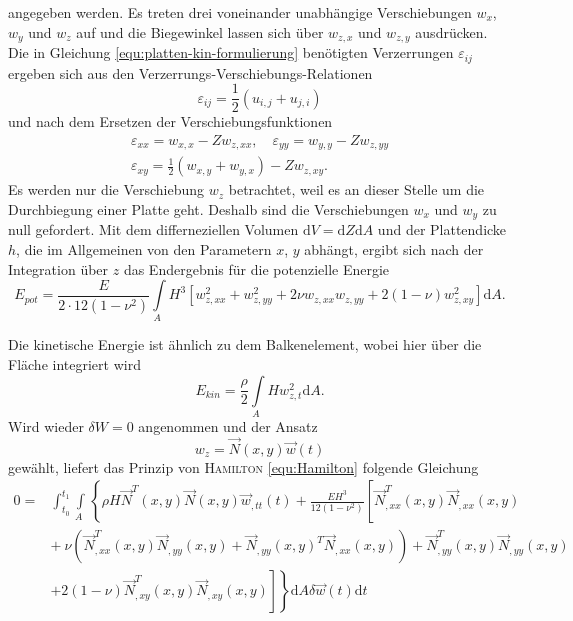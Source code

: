 \documentclass[a4paper,10pt,twoside]{article}
\numberwithin{equation}{section} %
\numberwithin{figure}{section}   %
\numberwithin{table}{section}    %
\begin{document}
	angegeben werden. Es treten drei voneinander unabhängige Verschiebungen $ w_{x} $, $ w_{y} $ und $ w_{z} $ auf und die Biegewinkel lassen sich über $ w_{z,x} $ und $ w_{z,y} $ ausdrücken. Die in Gleichung \eqref{equ:platten-kin-formulierung} benötigten Verzerrungen $ \varepsilon_{ij} $ ergeben sich aus den Verzerrungs-Verschiebungs-Relationen
	\begin{equation}\label{equ:verschiebung-verzerrung-relation}
	\varepsilon_{ij} = \frac{1}{2} \left( u_{i,j} + u_{j,i} \right) 
	\end{equation}
	und nach dem Ersetzen der Verschiebungsfunktionen
	\begin{equation}\label{equ:verschiebung-verzerrung-form}
	\begin{array}{l}
	\varepsilon_{xx}=w_{x,x}-Z w_{z,xx}, \quad \varepsilon_{yy}=w_{y,y}-Z w_{z,yy}\\
	\varepsilon_{xy}=\frac{1}{2}\left( w_{x,y}+w_{y,x} \right) -Z w_{z,xy}.
	\end{array}
	\end{equation}
	Es werden nur die Verschiebung $w_{z}$ betrachtet, weil es an dieser Stelle um die Durchbiegung einer Platte geht. Deshalb sind die Verschiebungen $ w_{x} $ und $ w_{y} $ zu null gefordert. Mit dem differneziellen Volumen $ \mathrm{d}V=\mathrm{d}Z\mathrm{d}A $ und der Plattendicke $h$, die im Allgemeinen von den Parametern $x$, $y$ abhängt, ergibt sich nach der Integration über $z$ das Endergebnis für die potenzielle Energie
	\begin{equation}\label{equ:platten-pot-energie-end}
	E_{pot}=\frac{E}{2\cdot12(1-\nu^{2})} \underset{A \ \ }{\int} H^{3} \left[ w_{z,xx}^{2}+w_{z,yy}^{2}+2\nu w_{z,xx}w_{z,yy}+2(1-\nu)w_{z,xy}^{2} \right] \mathrm{d}A.
	\end{equation}
	
	Die kinetische Energie ist ähnlich zu dem Balkenelement, wobei hier über die Fläche integriert wird
	\begin{equation}\label{equ:platten-kin-energie}
	E_{kin}= \frac{\rho}{2} \underset{A \ \ }{\int} Hw_{z,t}^{2} \mathrm{d}A.
	\end{equation}
	Wird wieder $\delta W = 0$ angenommen und der Ansatz
	\begin{equation}\label{equ:platten-w-ansatz}
	w_{z} = \vec{N}(x,y)\vec{w}(t)
	\end{equation}
	gewählt, liefert das Prinzip von \textsc{Hamilton} \eqref{equ:Hamilton} folgende Gleichung 
	\begin{equation}\label{equ:platten-hamilton-ansatz}
	\begin{split}	
	0= & \int_{t_{0}}^{t_{1}} \underset{A \ \ }{\int} \left\lbrace  \rho H \vec{N}^{T}(x,y) \vec{N}(x,y) \vec{w}_{,tt}(t) + \frac{EH^{3}}{12(1-\nu^{2})} \left[ \vec{N}_{,xx}^{T}(x,y)\vec{N}_{,xx}(x,y) \right. \right. \\
	&  + \ \nu(\vec{N}_{,xx}^{T}(x,y)\vec{N}_{,yy}(x,y)+\vec{N}_{,yy}(x,y)^{T}\vec{N}_{,xx}(x,y)) + \vec{N}_{,yy}^{T}(x,y)\vec{N}_{,yy}(x,y) \\
	& \left. \left.+2(1-\nu)\vec{N}_{,xy}^{T}(x,y)\vec{N}_{,xy}(x,y) \right]  \right\rbrace  \mathrm{d}A \delta\vec{w}(t) \mathrm{d}t 
	\end{split}
	\end{equation}
	
\end{document}
